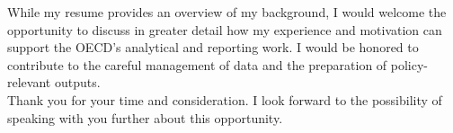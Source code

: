 \documentclass[11pt,a4paper,roman]{moderncv}
\begin{document}
\vspace{1em}
While my resume provides an overview of my background, I would welcome the opportunity to discuss in greater detail how my experience and motivation can support the OECD’s analytical and reporting work. I would be honored to contribute to the careful management of data and the preparation of policy-relevant outputs.\\

\vspace{1em}
Thank you for your time and consideration. I look forward to the possibility of speaking with you further about this opportunity.

\vspace{0.5cm}


\makeletterclosing
\end{document}
